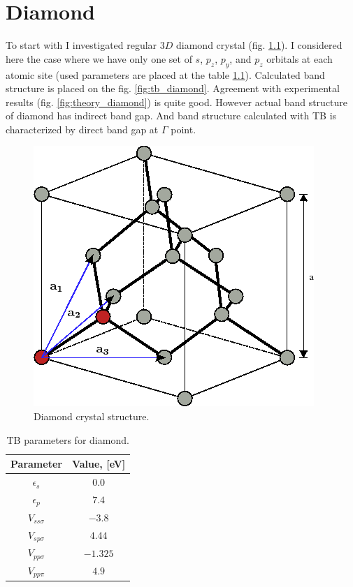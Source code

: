 \chapter{Diamond}
To start with I investigated regular $3D$ diamond crystal (fig. \ref{fig:diamond_lattice}). I considered here the case where we have only one set of $s$, $p_z$, $p_y$, and $p_z$ orbitals at each
atomic site (used parameters are placed at the table \ref{tab:diamond_params}). Calculated band structure is placed on the fig. \ref{fig:tb_diamond}. Agreement with experimental results \cite{diamond} (fig. \ref{fig:theory_diamond}) is quite good. However actual band structure of diamond has indirect band gap. And band structure calculated with TB is characterized by direct band gap at $\Gamma$ point.
\begin{figure}[h] 
 \begin{center}
  \includegraphics[width=0.3\linewidth]{img/diamond_crystall}
  \caption{Diamond crystal structure. \label{fig:diamond_lattice}}
 \end{center}
\end{figure}

\begin{table}[h]
 \begin{center}
  \begin{tabular}{|c|c|}
  \hline
    Parameter&Value, [eV]\\ \hline
    $\epsilon_s$ & $0.0$ \\ \hline
    $\epsilon_p$ & $7.4$ \\ \hline
    $V_{ss \sigma}$ & $-3.8$  \\ \hline
    $V_{sp \sigma}$ & $4.44$\\ \hline
    $V_{pp \sigma}$ & $-1.325$ \\ \hline
    $V_{pp \pi}$ &  $4.9$\\ \hline
  \end{tabular}
 \end{center}
  \caption{TB parameters for diamond. \label{tab:diamond_params}}
\end{table}

